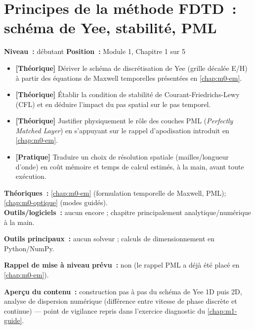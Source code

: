 
\chapter{Principes de la méthode FDTD~: schéma de Yee, stabilité, PML}
\label{chap:m1-principes}

\noindent\textbf{Niveau~:} débutant \hfill \textbf{Position~:} Module 1, Chapitre 1 sur 5

\begin{objectifs}
\begin{itemize}[leftmargin=1.4em]
  \item \textbf{[Théorique]} Dériver le schéma de discrétisation de Yee (grille décalée E/H) à partir des équations de Maxwell temporelles présentées en \cref{chap:m0-em}.
  \item \textbf{[Théorique]} Établir la condition de stabilité de Courant-Friedrichs-Lewy (CFL) et en déduire l'impact du pas spatial sur le pas temporel.
  \item \textbf{[Théorique]} Justifier physiquement le rôle des couches PML (\emph{Perfectly Matched Layer}) en s'appuyant sur le rappel d'apodisation introduit en \cref{chap:m0-em}.
  \item \textbf{[Pratique]} Traduire un choix de résolution spatiale (mailles/longueur d'onde) en coût mémoire et temps de calcul estimés, à la main, avant toute exécution.
\end{itemize}
\end{objectifs}

\begin{prerequis}
\textbf{Théoriques~:} \cref{chap:m0-em} (formulation temporelle de Maxwell, PML); \cref{chap:m0-optique} (modes guidés).\\
\textbf{Outils/logiciels~:} aucun encore ; chapitre principalement analytique/numérique \og à la main\fg{}.
\end{prerequis}

\noindent\textbf{Outils principaux~:} aucun solveur ; calculs de dimensionnement en Python/NumPy.

\noindent\textbf{Rappel de mise à niveau prévu~:} non (le rappel PML a déjà été placé en \cref{chap:m0-em}).

\noindent\textbf{Aperçu du contenu~:} construction pas à pas du schéma de Yee 1D puis 2D, analyse de dispersion numérique (différence entre vitesse de phase discrète et continue) — point de vigilance repris dans l'exercice diagnostic du \cref{chap:m1-guide}.

